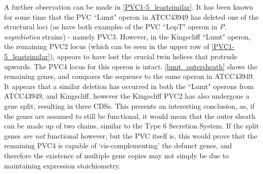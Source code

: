 A further observation can be made in \vref{PVC1-5_leastsimilar}. It has been known for some time that the PVC ``Lumt" operon in \Pasy{} ATCC43949 has deleted one of the structural loci (as have both examples of the PVC ``LopT" operon in \emph{P. asymbiotica} strains) - namely PVC3. However, in the Kingscliff ``Lumt" operon, the remaining PVC2 locus (which can be seen in the upper row of \vref{PVC1-5_leastsimilar}), appears to have lost the crucial twin helices that protrude upwards. The PVC4 locus for this operon is intact. \vref{lumt_outersheath} shows the remaining genes, and compares the sequence to the same operon in \Pasy{} ATCC43949. It appears that a similar deletion has occurred in both the ``Lumt" operons from \Pasy{} ATCC43949, and Kingscliff, however the Kingscliff PVC2 has also undergone a gene split, resulting in three CDSs. This presents an interesting conclusion, as, if the genes are assumed to still be functional, it would mean that the outer sheath can be made up of two chains, similar to the Type 6 Secretion System. If the split genes \emph{are not} functional however, but the PVC itself is, this would prove that the remaining PVC4 is capable of `cis-complementing' the defunct genes, and therefore the existence of multiple gene copies may not simply be due to maintaining expression stoichiometry.


